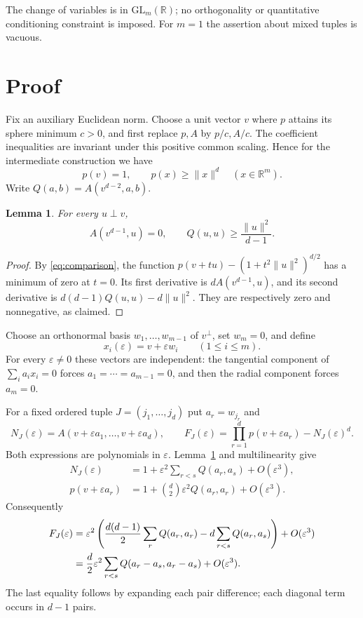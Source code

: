 \documentclass[11pt]{article}
\newtheorem{lemma}{Lemma}
\newcommand{\R}{\mathbb R}
\newcommand{\GL}{\mathrm{GL}}
\begin{document}
The change of variables is in $\GL_m(\R)$; no orthogonality or quantitative
conditioning constraint is imposed. For $m=1$ the assertion about mixed
tuples is vacuous.

\section{Proof}
Fix an auxiliary Euclidean norm. Choose a unit vector $v$ where $p$ attains
its sphere minimum $c>0$, and first replace $p,A$ by $p/c,A/c$.
The coefficient inequalities are invariant under this positive common
scaling. Hence for the intermediate construction we have
\begin{equation}\label{eq:comparison}
 p(v)=1,\qquad p(x)\ge \lVert x\rVert^d\quad(x\in\R^m).
\end{equation}
Write $Q(a,b)=A(v^{d-2},a,b)$.

\begin{lemma}\label{lem:tangent}
For every $u\perp v$,
\[
 A(v^{d-1},u)=0,\qquad Q(u,u)\ge\frac{\lVert u\rVert^2}{d-1}.
\]
\end{lemma}
\begin{proof}
By \eqref{eq:comparison}, the function
$p(v+tu)-(1+t^2\lVert u\rVert^2)^{d/2}$ has a minimum of zero at $t=0$.
Its first derivative is $dA(v^{d-1},u)$, and its second derivative is
$d(d-1)Q(u,u)-d\lVert u\rVert^2$. They are respectively zero and
nonnegative, as claimed.
\end{proof}

Choose an orthonormal basis $w_1,\ldots,w_{m-1}$ of $v^\perp$, set $w_m=0$,
and define
\begin{equation}\label{eq:basis}
 x_i(\varepsilon)=v+\varepsilon w_i\qquad(1\le i\le m).
\end{equation}
For every $\varepsilon\ne0$ these vectors are independent: the tangential
component of $\sum_i a_i x_i=0$ forces $a_1=\cdots=a_{m-1}=0$, and then
the radial component forces $a_m=0$.

For a fixed ordered tuple $J=(j_1,\ldots,j_d)$ put $a_r=w_{j_r}$ and
\[
 N_J(\varepsilon)=A(v+\varepsilon a_1,\ldots,v+\varepsilon a_d),\qquad
 F_J(\varepsilon)=\prod_{r=1}^d p(v+\varepsilon a_r)-N_J(\varepsilon)^d.
\]
Both expressions are polynomials in $\varepsilon$. Lemma~\ref{lem:tangent}
and multilinearity give
\begin{align*}
 N_J(\varepsilon)
 &=1+\varepsilon^2\sum_{r<s}Q(a_r,a_s)+O(\varepsilon^3),\\
 p(v+\varepsilon a_r)
 &=1+\binom d2\varepsilon^2 Q(a_r,a_r)+O(\varepsilon^3).
\end{align*}
Consequently
\begin{align}
 F_J(\varepsilon)
 &=\varepsilon^2\left(\frac{d(d-1)}2\sum_rQ(a_r,a_r)
              -d\sum_{r<s}Q(a_r,a_s)\right)+O(\varepsilon^3)\notag\\
 &=\frac d2\varepsilon^2\sum_{r<s}Q(a_r-a_s,a_r-a_s)
       +O(\varepsilon^3).\label{eq:gap}
\end{align}
The last equality follows by expanding each pair difference; each diagonal
term occurs in $d-1$ pairs.
\end{document}
